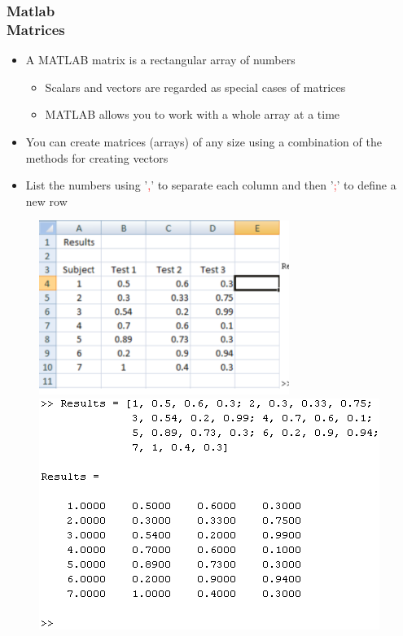 \documentclass[hyperref={pdfpagelabels=true}]{beamer}
\begin{document}
\begin{frame}
\frametitle{Matlab \\ {\small Matrices}}
\begin{itemize}
\item A MATLAB matrix is a rectangular array of numbers
  \begin{itemize}
  \item Scalars and vectors are regarded as special cases of matrices
  \item MATLAB allows you to work with a whole array at a time
  \end{itemize}
\item You can create matrices (arrays) of any size using a combination of the methods for creating vectors
\item List the numbers using '\textcolor{red}{\huge ,}' to separate each column and then '\textcolor{red}{\huge ;}' to define a new row
\end{itemize}
\begin{figure}[!tbp]
\centering
\includegraphics[scale = 0.32]{figs/Selection_018.png}
\includegraphics[scale = 0.3]{figs/Selection_018a.png}
\end{figure}
\end{frame}
\end{document}
